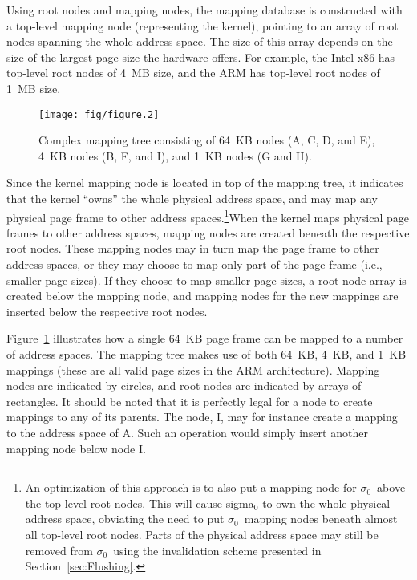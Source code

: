 \documentclass[a4paper,twoside]{book}
\newcommand{\sigmaz}{\mbox{$\sigma_0$}}
\begin{document}
Using root nodes and mapping nodes, the mapping database is
constructed with a top-level mapping node (representing the kernel),
pointing to an array of root nodes spanning the whole address space.
The size of this array depends on the size of the largest page size
the hardware offers.  For example, the Intel x86 has top-level root
nodes of 4~MB size, and the ARM has top-level root nodes of 1~MB size.

\begin{figure}[t]
  \begin{center}
    \texttt{[image: fig/figure.2]}
    \caption[Complex mapping tree]{Complex mapping tree consisting of
      64~KB nodes (A, C, D, and E), 4~KB nodes (B, F, and I), and 1~KB
      nodes (G and H).}
    \label{fig:complex-map}
  \end{center}
\end{figure}

Since the kernel mapping node is located in top of the mapping tree,
it indicates that the kernel ``owns'' the whole physical address
space, and may map any physical page frame to other address
spaces.\footnote{An optimization of this approach is to also put a
  mapping node for \sigmaz\ above the top-level root nodes.  This will
  cause sigma$_0$ to own the whole physical address space, obviating
  the need to put \sigmaz\ mapping nodes beneath almost all top-level
  root nodes.  Parts of the physical address space may still be
  removed from \sigmaz\ using the invalidation scheme presented in
  Section~\ref{sec:Flushing}.}\@ When the kernel maps physical page
frames to other address spaces, mapping nodes are created beneath the
respective root nodes.  These mapping nodes may in turn map the page
frame to other address spaces, or they may choose to map only part of
the page frame (i.e., smaller page sizes).  If they choose to map
smaller page sizes, a root node array is created below the mapping
node, and mapping nodes for the new mappings are inserted below the
respective root nodes.

Figure~\ref{fig:complex-map} illustrates how a single 64~KB page frame
can be mapped to a number of address spaces.  The mapping tree makes
use of both 64~KB, 4~KB, and 1~KB mappings (these are all valid page
sizes in the ARM architecture).  Mapping nodes are indicated by
circles, and root nodes are indicated by arrays of rectangles.  It
should be noted that it is perfectly legal for a node to create
mappings to any of its parents.  The node, I, may for instance create
a mapping to the address space of A.  Such an operation would simply
insert another mapping node below node I.
\end{document}
